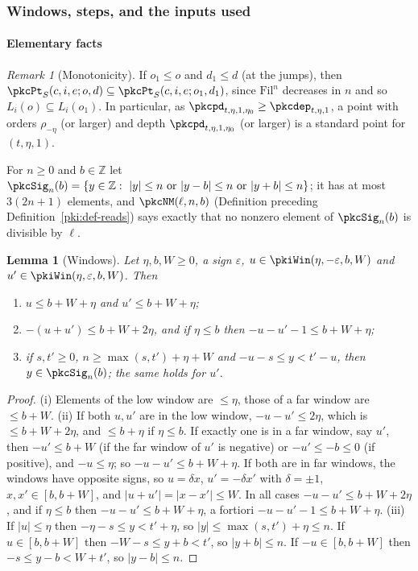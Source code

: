 \documentclass[10pt]{amsart}
\newtheorem{lemma}[theorem]{Lemma}
\theoremstyle{definition}
\theoremstyle{remark}
\newtheorem{remark}[theorem]{Remark}
\newcommand{\Z}{\mathbb Z}
\begin{document}
\subsubsection{Windows, steps, and the inputs used}\label{pkc:ss-inputs}

\paragraph*{Elementary facts}

\begin{remark}[Monotonicity]\label{pkc:mono}
If $o_1\le o$ and $d_1\le d$ (at the jumps), then $\pkcPt_S(c,i,e;o,d)\subseteq\pkcPt_S(c,i,e;o_1,d_1)$,
since $\mathrm{Fil}^n$ decreases in $n$ and so $L_i(o)\subseteq L_i(o_1)$. In particular, as
$\pkcpd_{t,\eta,1,\eta_0}\ge\pkcdep_{t,\eta,1}$, a point with orders $\rho_{-\eta}$ (or larger) and
depth $\pkcpd_{t,\eta,1,\eta_0}$ (or larger) is a standard point for $(t,\eta,1)$.
\end{remark}

For $n\ge0$ and $b\in\Z$ let $\pkcSig_n(b)=\{y\in\Z:\ |y|\le n\text{ or }|y-b|\le n\text{ or
}|y+b|\le n\}$; it has at most $3(2n+1)$ elements, and $\pkcNM(\ell,n,b)$ (Definition preceding
Definition~\ref{pki:def-reads}) says exactly that no nonzero element of $\pkcSig_n(b)$ is divisible by
$\ell$.

\begin{lemma}[Windows]\label{pkc:win}
Let $\eta,b,W\ge0$, a sign $\varepsilon$, $u\in\pkiWin(\eta,-\varepsilon,b,W)$ and
$u'\in\pkiWin(\eta,\varepsilon,b,W)$. Then
\begin{enumerate}
\item[(i)] $u\le b+W+\eta$ and $u'\le b+W+\eta$;
\item[(ii)] $-(u+u')\le b+W+2\eta$, and if $\eta\le b$ then $-u-u'-1\le b+W+\eta$;
\item[(iii)] if $s,t'\ge0$, $n\ge\max(s,t')+\eta+W$ and $-u-s\le y<t'-u$, then
$y\in\pkcSig_n(b)$; the same holds for $u'$.
\end{enumerate}
\end{lemma}

\begin{proof}
(i) Elements of the low window are $\le\eta$, those of a far window are $\le b+W$. (ii) If both
$u,u'$ are in the low window, $-u-u'\le2\eta$, which is $\le b+W+2\eta$, and $\le b+\eta$ if $\eta\le b$.
If exactly one is in a far window, say $u'$, then $-u'\le b+W$ (if the far window of $u'$ is negative)
or $-u'\le-b\le0$ (if positive), and $-u\le\eta$; so $-u-u'\le b+W+\eta$. If both are in far windows,
the windows have opposite signs, so $u=\delta x$, $u'=-\delta x'$ with $\delta=\pm1$, $x,x'\in[b,b+W]$,
and $|u+u'|=|x-x'|\le W$. In all cases $-u-u'\le b+W+2\eta$, and if $\eta\le b$ then $-u-u'\le
b+W+\eta$, a fortiori $-u-u'-1\le b+W+\eta$. (iii) If $|u|\le\eta$
then $-\eta-s\le y<t'+\eta$, so $|y|\le\max(s,t')+\eta\le n$. If $u\in[b,b+W]$ then $-W-s\le
y+b<t'$, so $|y+b|\le n$. If $-u\in[b,b+W]$ then $-s\le y-b<W+t'$, so $|y-b|\le n$.
\end{proof}
\end{document}
